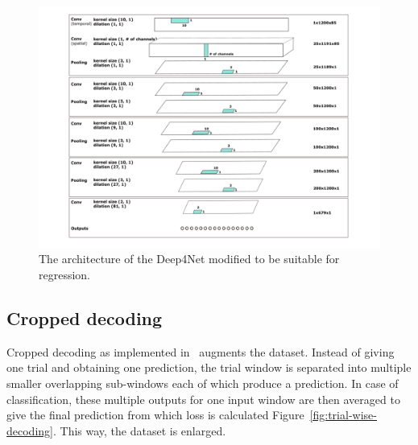 \begin{figure}[!htbp]
\centering
\includegraphics[width=\linewidth]{img/ch3/architektura}
\caption{The architecture of the Deep4Net modified to be suitable for regression.}
\label{fig:architecture}
\end{figure}

\subsection{Cropped decoding}\label{subsec:cropped-decoding}
Cropped decoding as implemented in~\cite{schirrmeister-deep-2017} augments the dataset.
Instead of giving one trial and obtaining one prediction, the trial window is separated into multiple smaller overlapping sub-windows each of which produce a prediction.
In case of classification, these multiple outputs for one input window are then averaged to give the final prediction from which loss is calculated Figure~\ref{fig:trial-wise-decoding}.
This way, the dataset is enlarged.

